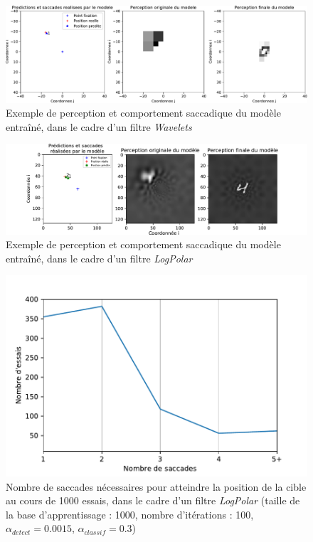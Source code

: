 \begin{figure}[th]
\centering
\includegraphics[scale=0.5]{Figures/saccades_wavelets}
\decoRule
\caption[Figure]{Exemple de perception et comportement saccadique du modèle entraîné, dans le cadre d'un filtre \textit{Wavelets}}
\label{fig:saccades_wavelets}
\end{figure}

\begin{figure}[th]
\centering
\includegraphics[scale=0.75]{Figures/saccades_logpolar}
\decoRule
\caption[Figure]{Exemple de perception et comportement saccadique du modèle entraîné, dans le cadre d'un filtre \textit{LogPolar}}
\label{fig:saccades_logpolar}
\end{figure}

\begin{figure}[th]
\centering
\includegraphics{Figures/sacc_nombre}
\decoRule
\caption[Figure]{Nombre de saccades nécessaires pour atteindre la position de la cible au cours de 1000 essais, dans le cadre d'un filtre \textit{LogPolar} (taille de la base d'apprentissage :  1000, nombre d'itérations : 100, $\alpha_{detect}=0.0015$, $\alpha_{classif}=0.3$)}
\label{fig:sacc_nombre}
\end{figure}

